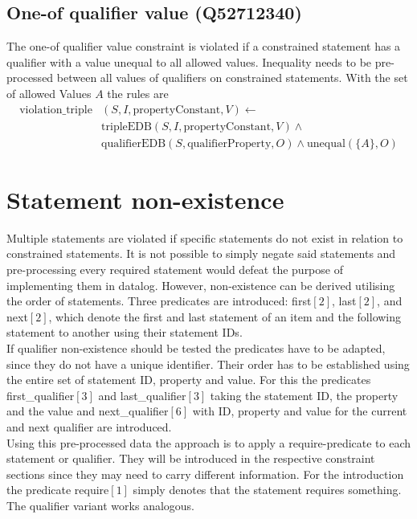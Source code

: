 \documentclass[hyperref,bachelorofscience,fleqn]{cgvpub}
\begin{document}
\subsection{One-of qualifier value (Q52712340)}
The one-of qualifier value constraint is violated if a constrained statement has a qualifier with a value unequal to all allowed values. Inequality needs to be pre-processed between all values of qualifiers on constrained statements. With the set of allowed Values \(A\) the rules are
\begin{equation*}
\begin{split}
\text{violation\_triple}&(S, I, \text{propertyConstant}, V) \leftarrow \\
&\text{tripleEDB}(S, I, \text{propertyConstant}, V) \wedge \\
&\text{qualifierEDB}(S, \text{qualifierProperty}, O) \wedge \text{unequal}(\{A\}, O)
\end{split}
\end{equation*}

\section{Statement non-existence}\label{sec_statement_non-existence}
Multiple statements are violated if specific statements do not exist in relation to constrained statements. It is not possible to simply negate said statements and pre-processing every required statement would defeat the purpose of implementing them in datalog. However, non-existence can be derived utilising the order of statements. Three predicates are introduced: first\([2]\), last\([2]\), and next\([2]\), which denote the first and last statement of an item and the following statement to another using their statement IDs.\\

If qualifier non-existence should be tested the predicates have to be adapted, since they do not have a unique identifier. Their order has to be established using the entire set of statement ID, property and value. For this the predicates first\_qualifier\([3]\) and last\_qualifier\([3]\) taking the statement ID, the property and the value and next\_qualifier\([6]\) with ID, property and value for the current and next qualifier are introduced.\\

Using this pre-processed data the approach is to apply a require-predicate to each statement or qualifier. They will be introduced in the respective constraint sections since they may need to carry different information. For the introduction the predicate require\([1]\) simply denotes that the statement requires something. The qualifier variant works analogous.\\
\end{document}
